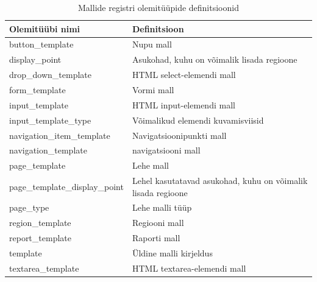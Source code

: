 \documentclass[a4paper,12pt]{article} %
\begin{document}
\begin{table}[H]
\centering
\caption{Mallide registri olemitüüpide definitsioonid}
\label{table_er_mallide_registri_olemitüüpide_definitsioonid}
\begin{tabular}{|p{5cm}|p{10cm}|}
\hline
\rowcolor{rowgray}
Olemitüübi nimi & Definitsioon \\ \hline
button\_template & Nupu mall \\ \hline
display\_point & Asukohad, kuhu on võimalik lisada regioone \\ \hline
drop\_down\_template & HTML select-elemendi mall \\ \hline
form\_template & Vormi mall \\ \hline
input\_template & HTML input-elemendi mall \\ \hline
input\_template\_type & Võimalikud elemendi kuvamisviisid  \\ \hline
navigation\_item\_template & Navigatsioonipunkti mall \\ \hline
navigation\_template & navigatsiooni mall \\ \hline
page\_template & Lehe mall \\ \hline
page\_template\_display\_point & Lehel kasutatavad asukohad, kuhu on võimalik lisada regioone \\ \hline
page\_type & Lehe malli tüüp \\ \hline
region\_template & Regiooni mall \\ \hline
report\_template & Raporti mall \\ \hline
template & Üldine malli kirjeldus \\ \hline
textarea\_template & HTML textarea-elemendi mall \\ \hline
\end{tabular}
\end{table}
\end{document}
